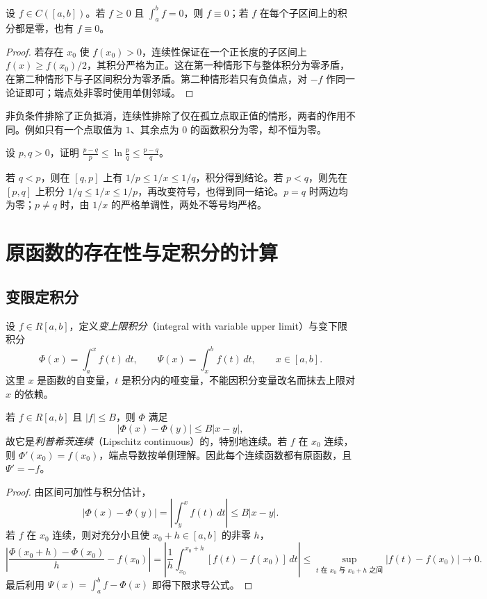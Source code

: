 \documentclass[UTF8,12pt,a4paper,fontset=fandol]{ctexbook}
\begin{document}
\begin{proposition}
\label{prop:zero-integral-continuous-functions}
设 $f\in C([a,b])$。若 $f\geq0$ 且 $\int_a^b f=0$，则 $f\equiv0$；若 $f$ 在每个子区间上的积分都是零，也有 $f\equiv0$。
\end{proposition}
\begin{proof}
若存在 $x_0$ 使 $f(x_0)>0$，连续性保证在一个正长度的子区间上 $f(x)\geq f(x_0)/2$，其积分严格为正。这在第一种情形下与整体积分为零矛盾，在第二种情形下与子区间积分为零矛盾。第二种情形若只有负值点，对 $-f$ 作同一论证即可；端点处非零时使用单侧邻域。
\end{proof}

非负条件排除了正负抵消，连续性排除了仅在孤立点取正值的情形，两者的作用不同。例如只有一个点取值为 $1$、其余点为 $0$ 的函数积分为零，却不恒为零。

\begin{example}
\label{ex:logarithm-integral-inequality}
设 $p,q>0$，证明 $\displaystyle\frac{p-q}{p}\leq\ln\frac pq\leq\frac{p-q}{q}$。
\end{example}
\begin{solve}
若 $q<p$，则在 $[q,p]$ 上有 $1/p\leq1/x\leq1/q$，积分得到结论。若 $p<q$，则先在 $[p,q]$ 上积分 $1/q\leq1/x\leq1/p$，再改变符号，也得到同一结论。$p=q$ 时两边均为零；$p\neq q$ 时，由 $1/x$ 的严格单调性，两处不等号均严格。
\end{solve}

\section{原函数的存在性与定积分的计算}
\label{sec:antiderivative-existence-and-definite-integration}

\subsection{变限定积分}
\label{subsec:definite-integrals-with-variable-limits}

设 $f\in R[a,b]$，定义\emph{变上限积分}（integral with variable upper limit）与变下限积分
\[
    \Phi(x)=\int_a^x f(t)\,dt,\qquad
    \Psi(x)=\int_x^b f(t)\,dt,\qquad x\in[a,b].
\]
这里 $x$ 是函数的自变量，$t$ 是积分内的哑变量，不能因积分变量改名而抹去上限对 $x$ 的依赖。

\begin{theorem}[变限积分与原函数]
\label{thm:variable-integral-and-antiderivative}
若 $f\in R[a,b]$ 且 $|f|\leq B$，则 $\Phi$ 满足
\[
    |\Phi(x)-\Phi(y)|\leq B|x-y|,
\]
故它是\emph{利普希茨连续}（Lipschitz continuous）的，特别地连续。若 $f$ 在 $x_0$ 连续，则 $\Phi'(x_0)=f(x_0)$，端点导数按单侧理解。因此每个连续函数都有原函数，且 $\Psi'=-f$。
\end{theorem}
\begin{proof}
由区间可加性与积分估计，
\[
    |\Phi(x)-\Phi(y)|=\left|\int_y^x f(t)\,dt\right|\leq B|x-y|.
\]
若 $f$ 在 $x_0$ 连续，则对充分小且使 $x_0+h\in[a,b]$ 的非零 $h$，
\[
    \left|\frac{\Phi(x_0+h)-\Phi(x_0)}h-f(x_0)\right|
    =\left|\frac1h\int_{x_0}^{x_0+h}[f(t)-f(x_0)]\,dt\right|
    \leq\sup_{t\text{ 在 }x_0\text{ 与 }x_0+h\text{ 之间}}|f(t)-f(x_0)|
    \longrightarrow0.
\]
最后利用 $\Psi(x)=\int_a^b f-\Phi(x)$ 即得下限求导公式。
\end{proof}
\end{document}
